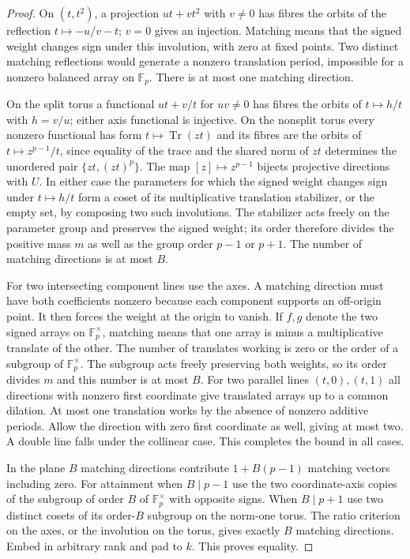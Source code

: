 \documentclass[11pt]{article}
\begin{document}
\begin{proof}
On $(t,t^2)$, a projection $ut+vt^2$ with $v\ne0$ has fibres the orbits of the reflection $t\mapsto -u/v-t$; $v=0$ gives an injection. Matching means that the signed weight changes sign under this involution, with zero at fixed points. Two distinct matching reflections would generate a nonzero translation period, impossible for a nonzero balanced array on $\mathbb F_p$. There is at most one matching direction.

On the split torus a functional $ut+v/t$ for $uv\ne0$ has fibres the orbits of $t\mapsto h/t$ with $h=v/u$; either axis functional is injective. On the nonsplit torus every nonzero functional has form $t\mapsto\operatorname{Tr}(zt)$ and its fibres are the orbits of $t\mapsto z^{p-1}/t$, since equality of the trace and the shared norm of $zt$ determines the unordered pair $\{zt,(zt)^p\}$. The map $[z]\mapsto z^{p-1}$ bijects projective directions with $U$. In either case the parameters for which the signed weight changes sign under $t\mapsto h/t$ form a coset of its multiplicative translation stabilizer, or the empty set, by composing two such involutions. The stabilizer acts freely on the parameter group and preserves the signed weight; its order therefore divides the positive mass $m$ as well as the group order $p-1$ or $p+1$. The number of matching directions is at most $B$.

For two intersecting component lines use the axes. A matching direction must have both coefficients nonzero because each component supports an off-origin point. It then forces the weight at the origin to vanish. If $f,g$ denote the two signed arrays on $\mathbb F_p^\times$, matching means that one array is minus a multiplicative translate of the other. The number of translates working is zero or the order of a subgroup of $\mathbb F_p^\times$. The subgroup acts freely preserving both weights, so its order divides $m$ and this number is at most $B$. For two parallel lines $(t,0),(t,1)$ all directions with nonzero first coordinate give translated arrays up to a common dilation. At most one translation works by the absence of nonzero additive periods. Allow the direction with zero first coordinate as well, giving at most two. A double line falls under the collinear case. This completes the bound in all cases.

In the plane $B$ matching directions contribute $1+B(p-1)$ matching vectors including zero. For attainment when $B\mid p-1$ use the two coordinate-axis copies of the subgroup of order $B$ of $\mathbb F_p^\times$ with opposite signs. When $B\mid p+1$ use two distinct cosets of its order-$B$ subgroup on the norm-one torus. The ratio criterion on the axes, or the involution on the torus, gives exactly $B$ matching directions. Embed in arbitrary rank and pad to $k$. This proves equality.
\end{proof}
\end{document}
